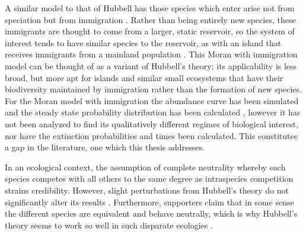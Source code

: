 A similar model to that of Hubbell has those species which enter arise not from speciation but from immigration \cite{McKane2003,Kessler2015}. 
Rather than being entirely new species, these immigrants are thought to come from a larger, static reservoir, so the system of interest tends to have similar species to the reservoir, as with an island that receives immigrants from a mainland population \cite{MacArthur1967a}. 
This Moran with immigration model can be thought of as a variant of Hubbell's theory; its applicability is less broad, but more apt for islands and similar small ecosystems that have their biodiversity maintained by immigration rather than the formation of new species. 
For the Moran model with immigration the abundance curve has been simulated \cite{Kessler2015} and the steady state probability distribution has been calculated \cite{McKane2003}, however it has not been analyzed to find its qualitatively different regimes of biological interest, nor have the extinction probabilities and times been calculated. 
This constitutes a gap in the literature, one which this thesis addresses. 

In an ecological context, the assumption of complete neutrality whereby each species competes with all others to the same degree as intraspecies competition strains credibility. 
However, slight perturbations from Hubbell's theory do not significantly alter its results \cite{Rosindell2011}. 
Furthermore, supporters claim that in some sense the different species are equivalent and behave neutrally, which is why Hubbell's theory seems to work so well in such disparate ecologies \cite{Leibold2006,Leigh2007,Hubbell2006,Rosindell2011}. 



